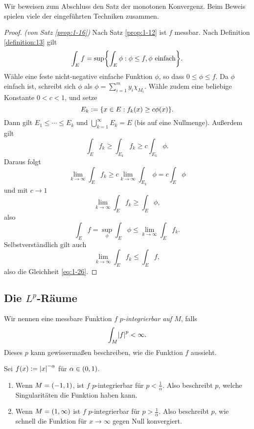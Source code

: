 Wir beweisen zum Abschluss den Satz der monotonen Konvergenz.
Beim Beweis spielen viele der eingeführten Techniken zusammen.

\begin{proof}
	\emph{(von Satz \ref{prop:1-16})} Nach Satz \ref{prop:1-12} ist \(f\) messbar.
	Nach Definition \ref{definition:13} gilt
	\[
		\int_E f = \sup\braces*{\int_E \phi : \phi \le f, \phi\text{ einfach}}.
	\]
	Wähle eine feste nicht-negative einfache Funktion \(\phi\), so dass \(0 \le \phi \le f\).
	Da \(\phi\) einfach ist, schreibt sich \(\phi\) als \(\phi = \sum_{i = 1}^m y_i \chi_{M_i}\).
	Wähle zudem eine beliebige Konstante \(0 < c < 1\), und setze
	\[
		E_k := \braces*{x \in E : f_k\parentheses*{x} \ge c\phi\parentheses*{x}}.
	\]
	Dann gilt \(E_1 \le \cdots \le E_k\) und \(\bigcup_{k = 1}^\infty E_k = E\) (bis auf eine Nullmenge).
	Außerdem gilt
	\begin{equation}
		\int_E f_k \ge \int_{E_k}f_k \ge c\int_{E_k}\phi.
	\end{equation}
	Daraus folgt
	\[
		\lim_{k \to \infty}\int_E f_k \ge c\lim_{k \to \infty}\int_{E_k}\phi = c\int_E \phi
	\]
	und mit \(c \to 1\)
	\[
		\lim_{k \to \infty}\int_E f_k \ge \int_E \phi,
	\]
	also
	\[
		\int_E f = \sup_\phi \int_E \phi \le \lim_{k \to \infty}\int_E f_k.
	\]
	Selbstverständlich gilt auch
	\[
		\lim_{k \to \infty}\int_E f_k \le \int_E f,
	\]
	also die Gleichheit \eqref{eq:1-26}.
\end{proof}


\subsection{Die $L^p$-Räume}

Wir nennen eine messbare Funktion \(f\) \emph{\(p\)-integrierbar auf \(M\)}, falls
\[
	\int_M \absolute*{f}^p < \infty.
\]
Dieses \(p\) kann gewissermaßen beschreiben, wie die Funktion \(f\) aussieht.

\begin{example}
	Sei \(f\parentheses*{x} := \absolute*{x}^{-\alpha}\) für \(\alpha \in \parentheses*{0, 1}\).
	\begin{enumerate}
		\item Wenn \(M = \parentheses*{-1, 1}\), ist \(f\) \(p\)-integrierbar für \(p < \frac{1}{\alpha}\).
		Also beschreibt \(p\), welche Singularitäten die Funktion haben kann.
		\item Wenn \(M = \parentheses*{1, \infty}\) ist \(f\) \(p\)-integrierbar für \(p > \frac{1}{\alpha}\).
		Also beschreibt \(p\), wie schnell die Funktion für \(x \to \infty\) gegen Null konvergiert.
	\end{enumerate}
\end{example}

